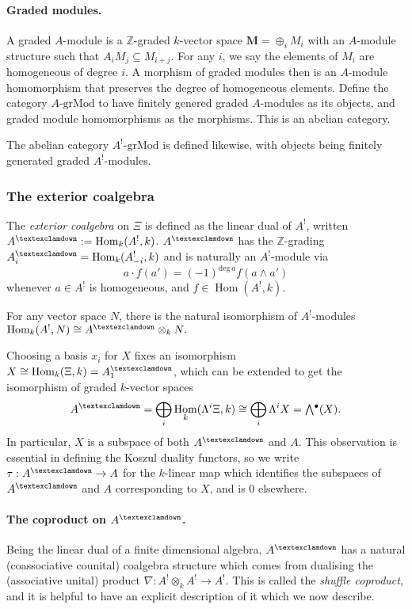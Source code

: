 \documentclass[a4paper]{article}
\theoremstyle{definition}
\theoremstyle{remark}
\newcommand{\Exter}{\mathchoice{{\textstyle\bigwedge}}%
    {{\bigwedge}}%
    {{\textstyle\wedge}}%
    {{\scriptstyle\wedge}}}
\newcommand{\grMod}{\ensuremath{\text{-grMod}}}
\DeclareMathOperator{\exterior}{\Exter^\bullet}
\DeclareMathOperator{\Hom}{\text{Hom}}
\newcommand{\gnab}{{\textexclamdown}}
\begin{document}
\paragraph{Graded modules.} A graded \(A\)-module is a \(\mathbb{Z}\)-graded
\(k\)-vector space \(\mathbf{M} = \oplus_i M_i\) with an \(A\)-module structure
such that \(A_iM_j \subseteq M_{i+j}\). For any \(i\), we say the elements of
\(M_i\) are homogeneous of degree \(i\). A morphism of graded modules then is an
\(A\)-module homomorphism that preserves the degree of homogeneous elements.
Define the category \(A\grMod\) to have  finitely genered graded \(A\)-modules
as its objects, and graded module homomorphisms as the morphisms. This is an
abelian category.

The abelian category \(A^!\grMod\) is defined likewise, with objects being
finitely generated graded \(A^!\)-modules.

\subsubsection{The exterior coalgebra}
\label{subsubsec-exteriorcoalgebra}

The \textit{exterior coalgebra} on \(\Xi\) is defined as the linear dual of
\(A^!\), written \(A^\gnab := \Hom_k(A^!, k)\). \(A^\gnab\) has the
\(\mathbb{Z}\)-grading \(A^\gnab_i=\Hom_k(A^!_{-i}, k)\) and is naturally an
\(A^!\)-module via \[a \cdot f(a') = (-1)^{\text{deg}\, a} f(a\wedge a')\]
whenever \(a\in A^!\) is homogeneous, and \(f\in \Hom(A^!,k)\). 

For any vector space \(N\), there is the natural isomorphism of
\(A^!\)-modules \({\Hom_{k}(A^!, N)\cong A^\gnab \otimes_k N}.\)  

Choosing a basis \(x_i\) for \(X\) fixes an isomorphism \(X\cong\Hom_k(\Xi,
k)=A^\gnab_1\), which can be extended to get the isomorphism of graded \(k\)-vector
spaces
\[A^\gnab = \bigoplus_i \Hom_k(\Lambda^i\Xi, k) \cong \bigoplus_i \Lambda^i X =
\exterior(X).\] 
In particular, \(X\) is a subspace of both \(A^\gnab\) and \(A\). This
observation is essential in defining the Koszul duality functors, so we write
\(\tau:A^\gnab \rightarrow A\) for the \(k\)-linear map which identifies the
subspaces of \(A^\gnab\) and \(A\) corresponding to \(X\), and is \(0\) elsewhere. 

\paragraph{The coproduct on \(A^\gnab\).}
Being the linear dual of a finite dimensional algebra, \(A^\gnab\) has a natural
(coassociative counital) coalgebra structure which comes from dualising the
(associative unital) product \({\nabla: A^!\otimes_k A^!\rightarrow A^!}\). This
is called the \textit{shuffle coproduct}, and it is helpful to have an explicit
description of it which we now describe. 
\end{document}
